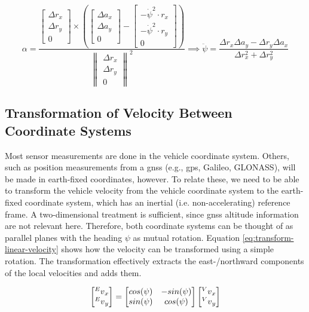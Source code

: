 \begin{equation}\label{eq:angacc-from-linacc-2d}%
\alpha%
= \frac{\begin{bmatrix}\Delta r_x \\ \Delta r_y \\ 0\end{bmatrix} \times \left(\begin{bmatrix}\Delta a_x \\ \Delta a_y \\ 0\end{bmatrix} - \begin{bmatrix}-\dot{\psi}^2 \cdot r_x \\ -\dot{\psi}^2 \cdot r_y \\ 0\end{bmatrix}\right)}{\begin{Vmatrix}\Delta r_x \\ \Delta r_y \\ 0\end{Vmatrix}^2}%
\implies \ddot{\psi} = \frac{\Delta r_x\Delta a_y - \Delta r_y\Delta a_x}{\Delta r_x^2 + \Delta r_y^2}%
\end{equation}


\subsection{Transformation of Velocity Between Coordinate Systems}\label{sec:background-transform-linvelocity}
Most sensor measurements are done in the vehicle coordinate system. Others, such as position measurements from a \gls{gnss} (e.g., \gls{gps}, Galileo, GLONASS), will be made in earth-fixed coordinates, however. To relate these, we need to be able to transform the vehicle velocity from the vehicle coordinate system to the earth-fixed coordinate system, which has an inertial (i.e. non-accelerating) reference frame. A two-dimensional treatment is sufficient, since \gls{gnss} altitude information are not relevant here. Therefore, both coordinate systems can be thought of as parallel planes with the heading $\psi$ as mutual rotation. Equation \ref{eq:transform-linear-velocity} shows how the velocity can be transformed using a simple rotation. The transformation effectively extracts the east-/northward components of the local velocities and adds them.

\begin{equation}\label{eq:transform-linear-velocity}%
\begin{bmatrix}\prescript{E}{}{v}_x \\ \prescript{E}{}{v}_y\end{bmatrix}%
=\begin{bmatrix}cos(\psi) & -sin(\psi) \\ sin(\psi) & cos(\psi)\end{bmatrix}%
\begin{bmatrix}\prescript{V}{}{v}_x \\ \prescript{V}{}{v}_y\end{bmatrix}%
\end{equation}



